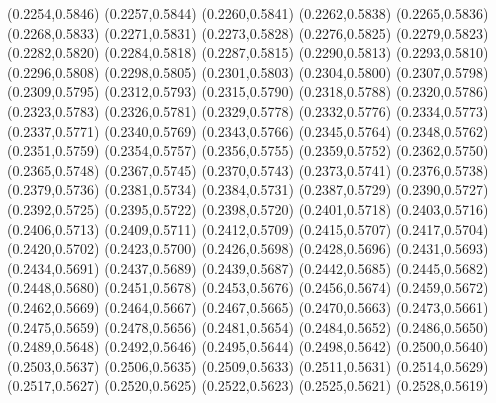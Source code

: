 \PST@Cross(0.2254,0.5846)
\PST@Cross(0.2257,0.5844)
\PST@Cross(0.2260,0.5841)
\PST@Cross(0.2262,0.5838)
\PST@Cross(0.2265,0.5836)
\PST@Cross(0.2268,0.5833)
\PST@Cross(0.2271,0.5831)
\PST@Cross(0.2273,0.5828)
\PST@Cross(0.2276,0.5825)
\PST@Cross(0.2279,0.5823)
\PST@Cross(0.2282,0.5820)
\PST@Cross(0.2284,0.5818)
\PST@Cross(0.2287,0.5815)
\PST@Cross(0.2290,0.5813)
\PST@Cross(0.2293,0.5810)
\PST@Cross(0.2296,0.5808)
\PST@Cross(0.2298,0.5805)
\PST@Cross(0.2301,0.5803)
\PST@Cross(0.2304,0.5800)
\PST@Cross(0.2307,0.5798)
\PST@Cross(0.2309,0.5795)
\PST@Cross(0.2312,0.5793)
\PST@Cross(0.2315,0.5790)
\PST@Cross(0.2318,0.5788)
\PST@Cross(0.2320,0.5786)
\PST@Cross(0.2323,0.5783)
\PST@Cross(0.2326,0.5781)
\PST@Cross(0.2329,0.5778)
\PST@Cross(0.2332,0.5776)
\PST@Cross(0.2334,0.5773)
\PST@Cross(0.2337,0.5771)
\PST@Cross(0.2340,0.5769)
\PST@Cross(0.2343,0.5766)
\PST@Cross(0.2345,0.5764)
\PST@Cross(0.2348,0.5762)
\PST@Cross(0.2351,0.5759)
\PST@Cross(0.2354,0.5757)
\PST@Cross(0.2356,0.5755)
\PST@Cross(0.2359,0.5752)
\PST@Cross(0.2362,0.5750)
\PST@Cross(0.2365,0.5748)
\PST@Cross(0.2367,0.5745)
\PST@Cross(0.2370,0.5743)
\PST@Cross(0.2373,0.5741)
\PST@Cross(0.2376,0.5738)
\PST@Cross(0.2379,0.5736)
\PST@Cross(0.2381,0.5734)
\PST@Cross(0.2384,0.5731)
\PST@Cross(0.2387,0.5729)
\PST@Cross(0.2390,0.5727)
\PST@Cross(0.2392,0.5725)
\PST@Cross(0.2395,0.5722)
\PST@Cross(0.2398,0.5720)
\PST@Cross(0.2401,0.5718)
\PST@Cross(0.2403,0.5716)
\PST@Cross(0.2406,0.5713)
\PST@Cross(0.2409,0.5711)
\PST@Cross(0.2412,0.5709)
\PST@Cross(0.2415,0.5707)
\PST@Cross(0.2417,0.5704)
\PST@Cross(0.2420,0.5702)
\PST@Cross(0.2423,0.5700)
\PST@Cross(0.2426,0.5698)
\PST@Cross(0.2428,0.5696)
\PST@Cross(0.2431,0.5693)
\PST@Cross(0.2434,0.5691)
\PST@Cross(0.2437,0.5689)
\PST@Cross(0.2439,0.5687)
\PST@Cross(0.2442,0.5685)
\PST@Cross(0.2445,0.5682)
\PST@Cross(0.2448,0.5680)
\PST@Cross(0.2451,0.5678)
\PST@Cross(0.2453,0.5676)
\PST@Cross(0.2456,0.5674)
\PST@Cross(0.2459,0.5672)
\PST@Cross(0.2462,0.5669)
\PST@Cross(0.2464,0.5667)
\PST@Cross(0.2467,0.5665)
\PST@Cross(0.2470,0.5663)
\PST@Cross(0.2473,0.5661)
\PST@Cross(0.2475,0.5659)
\PST@Cross(0.2478,0.5656)
\PST@Cross(0.2481,0.5654)
\PST@Cross(0.2484,0.5652)
\PST@Cross(0.2486,0.5650)
\PST@Cross(0.2489,0.5648)
\PST@Cross(0.2492,0.5646)
\PST@Cross(0.2495,0.5644)
\PST@Cross(0.2498,0.5642)
\PST@Cross(0.2500,0.5640)
\PST@Cross(0.2503,0.5637)
\PST@Cross(0.2506,0.5635)
\PST@Cross(0.2509,0.5633)
\PST@Cross(0.2511,0.5631)
\PST@Cross(0.2514,0.5629)
\PST@Cross(0.2517,0.5627)
\PST@Cross(0.2520,0.5625)
\PST@Cross(0.2522,0.5623)
\PST@Cross(0.2525,0.5621)
\PST@Cross(0.2528,0.5619)
